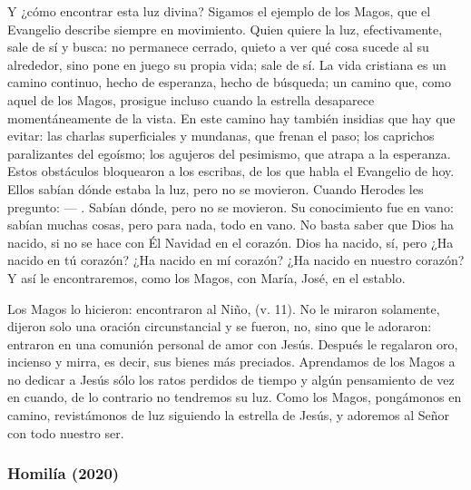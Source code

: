 \begin{body}
					Y ¿cómo encontrar esta luz divina? Sigamos el ejemplo de los Magos, que el Evangelio describe siempre en movimiento. Quien quiere la luz, efectivamente, sale de sí y busca: no permanece cerrado, quieto a ver qué cosa sucede al su alrededor, sino pone en juego su propia vida; sale de sí. La vida cristiana es un camino continuo, hecho de esperanza, hecho de búsqueda; un camino que, como aquel de los Magos, prosigue incluso cuando la estrella desaparece momentáneamente de la vista. En este camino hay también insidias que hay que evitar: las charlas superficiales y mundanas, que frenan el paso; los caprichos paralizantes del egoísmo; los agujeros del pesimismo, que atrapa a la esperanza. Estos obstáculos bloquearon a los escribas, de los que habla el Evangelio de hoy. Ellos sabían dónde estaba la luz, pero no se movieron. Cuando Herodes les pregunto:  --- . Sabían dónde, pero no se movieron. Su conocimiento fue en vano: sabían muchas cosas, pero para nada, todo en vano. No basta saber que Dios ha nacido, si no se hace con Él Navidad en el corazón. Dios ha nacido, sí, pero ¿Ha nacido en tú corazón? ¿Ha nacido en mí corazón? ¿Ha nacido en nuestro corazón? Y así le encontraremos, como los Magos, con María, José, en el establo.
					
					Los Magos lo hicieron: encontraron al Niño,  (v. 11). No le miraron solamente, dijeron solo una oración circunstancial y se fueron, no, sino que le adoraron: entraron en una comunión personal de amor con Jesús. Después le regalaron oro, incienso y mirra, es decir, sus bienes más preciados. Aprendamos de los Magos a no dedicar a Jesús sólo los ratos perdidos de tiempo y algún pensamiento de vez en cuando, de lo contrario no tendremos su luz. Como los Magos, pongámonos en camino, revistámonos de luz siguiendo la estrella de Jesús, y adoremos al Señor con todo nuestro ser.
				\end{body}
			
			\subsubsection{Homilía (2020)}
			
				
